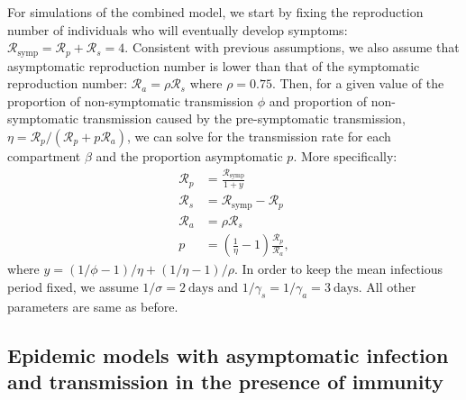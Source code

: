 \documentclass[12pt]{article}
\newcommand{\RR}{\ensuremath{{\mathcal R}}\xspace}
\begin{document}
For simulations of the combined model, we start by fixing the reproduction number of individuals who will eventually develop symptoms: $\RR_{\textrm{symp}} = \RR_p + \RR_s = 4$. 
Consistent with previous assumptions, we also assume that asymptomatic reproduction number is lower than that of the symptomatic reproduction number: $\RR_a = \rho \RR_s$ where $\rho = 0.75$.
Then, for a given value of the proportion of non-symptomatic transmission $\phi$ and proportion of non-symptomatic transmission caused by the pre-symptomatic transmission, $\eta = \RR_p/(\RR_p + p \RR_a)$, we can solve for the transmission rate for each compartment $\beta$ and the proportion asymptomatic $p$.
More specifically:
\begin{align}
\RR_p &= \frac{\RR_{\textrm{symp}}}{1 + y}\\
\RR_s &= \RR_{\textrm{symp}} - \RR_p\\
\RR_a &=  \rho \RR_s\\
p &= \left(\frac{1}{\eta} - 1 \right) \frac{\RR_p}{\RR_a},
\end{align}
where $y = (1/\phi - 1)/\eta + (1/\eta - 1)/\rho$.
In order to keep the mean infectious period fixed, we assume $1/\sigma=2\ \mathrm{days}$ and $1/\gamma_s=1/\gamma_a=3\ \mathrm{days}$. All other parameters are same as before.

\subsection*{Epidemic models with asymptomatic infection and transmission in the presence of immunity}
\end{document}
